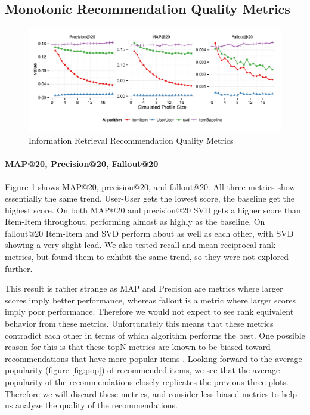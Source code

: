 \documentclass[letterpaper]{sig-alternate}
\begin{document}


\subsection {Monotonic Recommendation Quality Metrics}

\begin{figure}[ht!]
  \centering
  \includegraphics[width=\linewidth]{../lenskit/output/ekstrandTuned20/TopNPrecision.pdf}
  \caption{Information Retrieval Recommendation Quality Metrics}
  \label{fig:map}
\end{figure}
\paragraph{MAP@20, Precision@20, Fallout@20}
  Figure \ref{fig:map} shows MAP@20, precision@20, and fallout@20.
  All three metrics show essentially the same trend, User-User gets the lowest score, the baseline get the highest score.
  On both MAP@20 and precision@20 SVD gets a higher score than Item-Item throughout, performing almost as highly as the baseline.
  On fallout@20 Item-Item and SVD perform about as well as each other, with SVD showing a very slight lead.
  We also tested recall and mean reciprocal rank metrics, but found them to exhibit the same trend, so they were not explored further.

  This result is rather strange as MAP and Precision are metrics where larger scores imply better performance, whereas fallout is a metric where larger scores imply poor performance.
  Therefore we would not expect to see rank equivalent behavior from these metrics.
  Unfortunately this means that these metrics contradict each other in terms of which algorithm performs the best.
  One possible reason for this is that these topN metrics are known to be biased toward recommendations that have more popular items \cite{bellogin}.
  Looking forward to the average popularity (figure \ref{fig:pop}) of recommended items, we see that the average popularity of the recommendations closely replicates the previous three plots.
  Therefore we will discard these metrics, and consider less biased metrics to help us analyze the quality of the recommendations.
\end{document}
